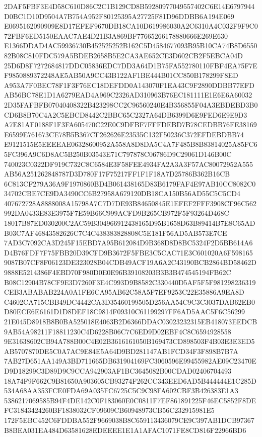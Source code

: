 \documentclass[UTF8,fontset=fandol,zihao=-4,a4paper]{ctexart}
\begin{document}
{{2DAF5FBF3E4D58C610D86C2C1B129CD8B59280977049557402C6E14E6797944D0BC1D10D9504A7B754A952F80125395A27725F81D96DDBB6A194E069
E0695162090909E8D17EFEF9670DB18CA10D619986030A2C6310A4C032F9F9C072FBF6ED5150EAAC7AE4D21B3A869BF77665266178880666E269E630
E1366DDAD4AC59936730B452525252B162C5D4584677093B95B10CA74B8D655082B08C810FDC579A5BDEB2658B5E2CA3AE652CE3D602CB2F5EBCA04D
25D6D8F7272684817DDC05836EDC7DD3A64D1B75FA552780110FBF4EA75F7EF9850889372248AE5AB50A9CC43B122AF1BE444B01CC850B178299F8ED
A953A7F0BEC78F1F3F76EC18DEFDD0A143070F1EA43C9F2890DDBB77EFDAB56BC78E1D1A6279EAD4A969C2326AD310963B76EC181111E1E6E6A60032
2D35FAFBFB07040408322B423298CC2C96560240E4B356855F04A3EBDEBD3B0CD6B8B70C4A2C5EBCD8442C2BBC65C2327A64DB6399D6E9FED6E9E9D3
A7E81AF0188F1F3FA605470C22E0C9DFBF7FFFDEBD7B78CEDBB76FE38169E6599E761673CE78B5B367CF262626E23535C132F50236C372EFDEBDBB74
E9121515E5EEEEAE06328600952A558A8D8DA5C4A7F485B8B83814025A85FC65FC396A9C6D8AC5B250B03543E71C797878C06786D9C29061D146B00C
740023C0322DF919C732C8C6584E3F58FEE4934FA2A3A3F57AC80072952A555AB56A251262848787D3D780F17F75217FF1F1F18A7D25786B362B16CB
6C813CF279A36A9F1970860BD4B061438165D83B6179FAF4E97AB10CC8082C034702CBE7CE9DA3490CC6B27958A679120DB18CA150B56AD55C5C5CD4
407672728A8888008A15798A7C7D7DE93B84650845E1EFEF2FFF3908CF96C562992DA0433E83E3975F7E59B66C999ACFD9B265CB972F5F93264D468C
18017B87ED030200C2AC59B304966912438165D95B1658D63B89414B7E8C65ADB03C7AF46843582626C7C4C438383828808C5E181F56AD5AB573E7CE
7AD3C7092CA3D245F15EBD7A95B612084D9B368D8D8BC5324F2D5BB614A6D4B76FDF7F75FBB20D39CFD9B3672F5FBE3C5CAC71E3C601020A6F598165
9087B07CF8F06123DE323028B04CDB49ACF19A6A2C43190BCB2864BD58462D9888E5214386F4EBD70F980D0E0E96B39108203B3B3B474545194FB62C
B08C12904B78CF9E3D7260F3E4C993D9B8582C330440D5AF5F5F981298236319CEB3ABABAB224A0A1FE6CA95AB62C58A5F7EF9253C22E35886A9EA8D
C4602CA715CBB49DC4442CA3D35460199505D256AA54C9C3C3037DAB62EB0D80ECE6E6161D1D8DEF18C9814F09310C61199297FF6AD5AAC5F6C56299
21E045D8918B8B0BA525018E4063B2D6366DDAC03023232315EB418073EEDCB9AB54A98211F18811230C4D6228B06C7C6ED9D02EBF4C8C6594928558
9E31638602CB94A788B00C4E02B3616161050B169473CD898503F4B03E3E3ED5AB5707870DE5C0A7AC9E84E5A64D9BD281147AB1FCD34F3F898B7B7A
7AB27D651AA149A3BD711665DB631904169FC3060596E99455982AE09C23470ED9D18299C3D89D9C9CCA942903AF1BC3645082B00CDAD02406704493
18A74F9F662C9B81650A903605CB93274F262CC343EED6AD5B444444E1C285D534A68AA353FCE0FDA69A035FC6725C5C9C98FA602CBF3B426383E1A3
5386217069585B94F4DE142C0F183060E0C0811F7EF861891225F46EC5852F8DEFC31843424260BF1838032CF09609CB60948973CB56C232915981E5
172F5EBC452C6FDDBA552F9669038B8C659113436079CE9C397AB1DCB97367B8BEA031EA484D63581628EDEEEE1E1A1AFAC1071FE8CD816F22966BD6
}}
\end{document}
